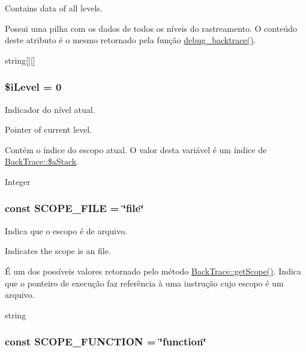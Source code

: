 Contains data of all levels.

Possui uma pilha com os dados de todos os níveis do rastreamento. O conteúdo deste atributo é o mesmo retornado pela função \hyperlink{}{debug\_\-backtrace()}.

string\mbox{[}\mbox{]}\mbox{[}\mbox{]} \hypertarget{class_back_trace_128f1dc665616c26696bdedbea55f312}{
\subsubsection[{\$iLevel}]{\setlength{\rightskip}{0pt plus 5cm}\$iLevel = 0}}
\label{class_back_trace_128f1dc665616c26696bdedbea55f312}


Indicador do nível atual.

Pointer of current level.

Contém o índice do escopo atual. O valor desta variável é um índice de \hyperlink{class_back_trace_5cb2fde204eda0effb2a17536b7cf962}{BackTrace::\$aStack}.

Integer \hypertarget{class_back_trace_41001bb7178dc4a269ad6bebebc88da1}{
\subsubsection[{SCOPE\_\-FILE}]{\setlength{\rightskip}{0pt plus 5cm}const {\bf SCOPE\_\-FILE} = \char`\"{}file\char`\"{}}}
\label{class_back_trace_41001bb7178dc4a269ad6bebebc88da1}


Indica que o escopo é de arquivo.

Indicates the scope is an file.

É um dos possíveis valores retornado pelo método \hyperlink{class_back_trace_0dce4e854dda57ffc316fd755df9b309}{BackTrace::getScope()}. Indica que o ponteiro de execução faz referência à uma instrução cujo escopo é um arquivo.

string \hypertarget{class_back_trace_eea61035bd38b8bdc6b3abc4e387d98f}{
\subsubsection[{SCOPE\_\-FUNCTION}]{\setlength{\rightskip}{0pt plus 5cm}const {\bf SCOPE\_\-FUNCTION} = \char`\"{}function\char`\"{}}}
\label{class_back_trace_eea61035bd38b8bdc6b3abc4e387d98f}


